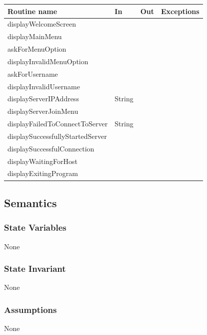 \documentclass[12pt, titlepage]{article}
\begin{document}
        \begin{tabular}{| l | l | l | p{6cm} |}
            \hline
            \textbf{Routine name} & \textbf{In} & \textbf{Out} & \textbf{Exceptions}\\
            \hline
            displayWelcomeScreen &  &  & \\
            \hline
            displayMainMenu &  &  &\\
            \hline 
            askForMenuOption &  &  & \\
            \hline 
            displayInvalidMenuOption &  &  &\\
            \hline 
            askForUsername &  &  & \\
            \hline
            displayInvalidUsername &  &  &\\
            \hline 
            displayServerIPAddress & String &  & \\
            \hline 
            displayServerJoinMenu &  &  &\\
            \hline 
            displayFailedToConnectToServer & String &  & \\
            \hline
            displaySuccessfullyStartedServer &  &  &\\
            \hline 
            displaySuccessfulConnection &  &  & \\
            \hline 
            displayWaitingForHost &  &  &\\
            \hline 
            displayExitingProgram &  &  &\\
            \hline 
        \end{tabular}
        
    \subsection* {Semantics}
    
    \subsubsection* {State Variables}
        None
        
    \subsubsection* {State Invariant}
        None
    
    \subsubsection* {Assumptions}
        None
    
\end{document}
